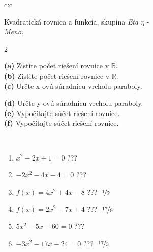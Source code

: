 \documentclass[10pt]{report}
\begin{document}
\begin{tabular}{c:c}
\begin{minipage}[c][104.5mm][t]{0.5\linewidth}
\begin{center}
\vspace{7mm}
{\huge {\LARGE Kvadratická rovnica a funkcia}, skupina \textit{Eta $\eta$} -}\\[5mm]
\textit{Meno:}\phantom{xxxxxxxxxxxxxxxxxxxxxxxxxxxxxxxxxxxxxxxxxxxxxxxxxxxxxxxxxxxxxxxxx}\\[5mm]
\begin{minipage}{0.95\linewidth}
\begin{center}
{\small \begin{multicols}{2} \raggedright
\textbf{(a)} Zistite počet riešení rovnice v \(\mathbb{R}\). \\[1mm]
\textbf{(b)} Zistite počet riešení rovnice v \(\mathbb{R}\). \\[1mm]
\textbf{(c)} Určte x-ovú súradnicu vrcholu paraboly. \par \columnbreak
\textbf{(d)} Určte y-ovú súradnicu vrcholu paraboly. \\[1mm]
\textbf{(e)} Vypočítajte súčet riešení rovnice. \\[1mm]
\textbf{(f)} Vypočítajte súčet riešení rovnice.
\end{multicols}
}
\end{center}
\end{minipage}
\\[4mm]
\begin{minipage}{0.79\linewidth}
\begin{center}
\begin{varwidth}{\linewidth}
\begin{enumerate}
\Large
\item $x^2-2x+1=0$\quad \dotfill\; ???\;\dotfill {}
\item $-2x^2-4x-4=0$\quad \dotfill\; ???\;\dotfill {}
\item $f(x)=4x^2+4x-8$\quad \dotfill\; ???\;\dotfill \quad $\nicefrac{-1}{2}$
\item $f(x)=2x^2-7x+4$\quad \dotfill\; ???\;\dotfill \quad $\nicefrac{-17}{8}$
\item $5x^2-5x-60=0$\quad \dotfill\; ???\;\dotfill {}
\item $-3x^2-17x-24=0$\quad \dotfill\; ???\;\dotfill \quad $\nicefrac{-17}{3}$
\end{enumerate}
\end{varwidth}
\end{center}

\end{minipage}
\end{center}
\end{minipage}
\end{tabular}
\end{document}

